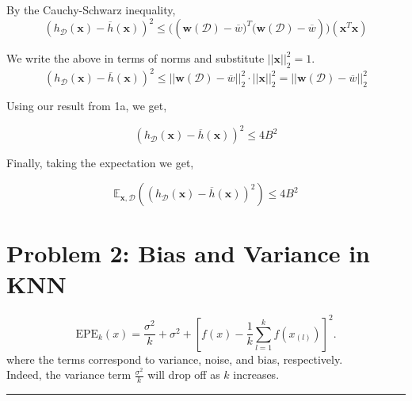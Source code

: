 \documentclass{article}
\begin{document}
\begin{enumerate}[(a)]
        By the Cauchy-Schwarz inequality,
        $$(h_\mathcal{D}(\mathbf{x}) - \overline{h}(\mathbf{x})) ^ 2 \leq  \big((\mathbf{w}(\mathcal{D}) - \overline{w}\big) ^T \big(\mathbf{w}(\mathcal{D}) - \overline{w})\big)(\mathbf{x}^T\mathbf{x})$$
        
        We write the above in terms of norms and substitute $||\mathbf{x}||_2^2 = 1$.
        $$(h_\mathcal{D}(\mathbf{x}) - \overline{h}(\mathbf{x})) ^ 2 \leq  ||\mathbf{w}(\mathcal{D}) - \overline{w}||_2^2 \cdot ||\mathbf{x}||_2^2=||\mathbf{w}(\mathcal{D}) - \overline{w}||_2^2$$

        Using our result from 1a, we get,

        $$(h_\mathcal{D}(\mathbf{x}) - \overline{h}(\mathbf{x})) ^ 2 \leq 4B^2 $$

        Finally, taking the expectation we get,

        $$\mathbb{E}_{\mathbf{x}, \mathcal{D}}((h_\mathcal{D}(\mathbf{x}) - \overline{h}(\mathbf{x})) ^ 2) \leq 4B^2$$
    \end{enumerate}
    \newpage
    \section*{Problem 2: Bias and Variance in KNN}
    $$\text{EPE}_k (x) = \frac{\sigma^2}{k} + \sigma^2 + \left[f(x) - \frac{1}{k}\sum_{l=1}^{k}f(x_{(l)})\right]^2.$$
    where the terms correspond to variance, noise, and bias, respectively.\\
    Indeed, the variance term $\frac{\sigma^2}{k}$ will drop off as $k$ increases.
    \\\hrule
    \noindent
    
\end{document}
